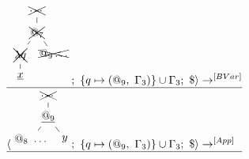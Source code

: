 \documentclass[a4paper, 10pt]{article}
\begin{document}
\begin{align*}
\begin{tikzpicture}[sibling distance=3em,level distance=2em]
    \node {\xcancel{$\dots$}}
    child { node {$\xcancel{@_7}$}
      child { node {$\xcancel{\lambda q}$}
        child { node {$\underline{x}$}}}
      child { node {$\xcancel{@_9 \dots}$}}};
\end{tikzpicture};\ \{q \mapsto (@_9,\ \Gamma_3)\} \cup \Gamma_3;\ \$ \rangle
& \rightarrow^{[BVar]}\\
\hline
\langle \begin{tikzpicture}[sibling distance=3em,level distance=2em]
    \node {\xcancel{$\dots$}}
    child { node {$\underline{@_9}$}
      child { node {$@_8\ \dots$}}
      child { node {$y$}}};
\end{tikzpicture};\ \{q \mapsto (@_9,\ \Gamma_3)\} \cup \Gamma_3;\ \$ \rangle
& \rightarrow^{[App]} \\
\hline
\end{align*}
\end{document}
